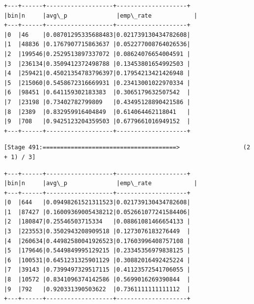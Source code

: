 \documentclass[11pt]{article}
\begin{document}
    \begin{Verbatim}[commandchars=\\\{\}]
+---+------+-------------------+--------------------+
|bin|n     |avg\_p              |emp\_rate            |
+---+------+-------------------+--------------------+
|0  |46    |0.08701295335688483|0.021739130434782608|
|1  |48836 |0.1767907715863637 |0.052277008764026536|
|2  |199546|0.2529513897337072 |0.08624076654004591 |
|3  |236134|0.3509412372498788 |0.13453801654992503 |
|4  |259421|0.45021354783796397|0.17954213421426948 |
|5  |215060|0.5458672316669931 |0.23413001022970334 |
|6  |98451 |0.641159302183383  |0.3065179632507542  |
|7  |23198 |0.73402782799809   |0.43495128890421586 |
|8  |2389  |0.832959916404849  |0.614064462118041   |
|9  |708   |0.9425123204359503 |0.6779661016949152  |
+---+------+-------------------+--------------------+

    \end{Verbatim}

    \begin{Verbatim}[commandchars=\\\{\}]
[Stage 491:======================================>                  (2 + 1) / 3]
    \end{Verbatim}

    \begin{Verbatim}[commandchars=\\\{\}]
+---+------+-------------------+--------------------+
|bin|n     |avg\_p              |emp\_rate            |
+---+------+-------------------+--------------------+
|0  |644   |0.09498261521311523|0.021739130434782608|
|1  |87427 |0.16009369005438212|0.052661077241584406|
|2  |180847|0.25546503715334   |0.08861081466654133 |
|3  |223553|0.3502943208909518 |0.1273076183276449  |
|4  |260634|0.44982580041926523|0.17603996408757108 |
|5  |179646|0.5449849995129215 |0.23345356979838125 |
|6  |100531|0.6451231325901129 |0.30882016492425224 |
|7  |39143 |0.7399497329517115 |0.41123572541706055 |
|8  |10572 |0.8341096374142586 |0.5699016269390844  |
|9  |792   |0.920331390503622  |0.7361111111111112  |
+---+------+-------------------+--------------------+

    \end{Verbatim}

    \begin{Verbatim}[commandchars=\\\{\}]

    \end{Verbatim}
\end{document}
